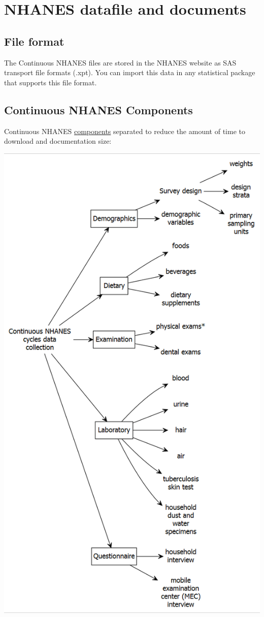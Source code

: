 \documentclass[
]{book}
\begin{document}
\hypertarget{nhanes-datafile-and-documents}{%
\section{NHANES datafile and documents}\label{nhanes-datafile-and-documents}}

\hypertarget{file-format}{%
\subsection{File format}\label{file-format}}

The Continuous NHANES files are stored in the NHANES website as SAS transport file formats (.xpt). You can import this data in any statistical package that supports this file format.

\hypertarget{continuous-nhanes-components}{%
\subsection{Continuous NHANES Components}\label{continuous-nhanes-components}}

Continuous NHANES \href{https://www.cdc.gov/nchs/tutorials/NHANES/SurveyOrientation/DataStructureContents/Info1.htm}{components} separated to reduce the amount of time to download and documentation size:

\includegraphics[width=0.65\linewidth]{images/g2}
\end{document}
